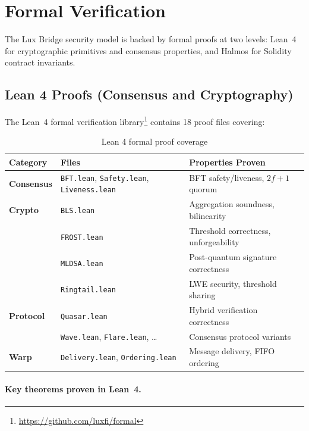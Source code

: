 \documentclass[11pt]{article}
\begin{document}
\section{Formal Verification}\label{sec:formal}

The Lux Bridge security model is backed by formal proofs at two levels: Lean~4 for cryptographic primitives and consensus properties, and Halmos for Solidity contract invariants.

\subsection{Lean 4 Proofs (Consensus and Cryptography)}

The Lean~4 formal verification library\footnote{\url{https://github.com/luxfi/formal}} contains 18 proof files covering:

\begin{table}[h]
\centering
\begin{tabular}{lll}
\toprule
\textbf{Category} & \textbf{Files} & \textbf{Properties Proven} \\
\midrule
\textbf{Consensus} & \texttt{BFT.lean}, \texttt{Safety.lean}, \texttt{Liveness.lean} & BFT safety/liveness, $2f+1$ quorum \\
\textbf{Crypto} & \texttt{BLS.lean} & Aggregation soundness, bilinearity \\
& \texttt{FROST.lean} & Threshold correctness, unforgeability \\
& \texttt{MLDSA.lean} & Post-quantum signature correctness \\
& \texttt{Ringtail.lean} & LWE security, threshold sharing \\
\textbf{Protocol} & \texttt{Quasar.lean} & Hybrid verification correctness \\
& \texttt{Wave.lean}, \texttt{Flare.lean}, \ldots & Consensus protocol variants \\
\textbf{Warp} & \texttt{Delivery.lean}, \texttt{Ordering.lean} & Message delivery, FIFO ordering \\
\bottomrule
\end{tabular}
\caption{Lean 4 formal proof coverage}
\end{table}

\paragraph{Key theorems proven in Lean~4.}
\end{document}

